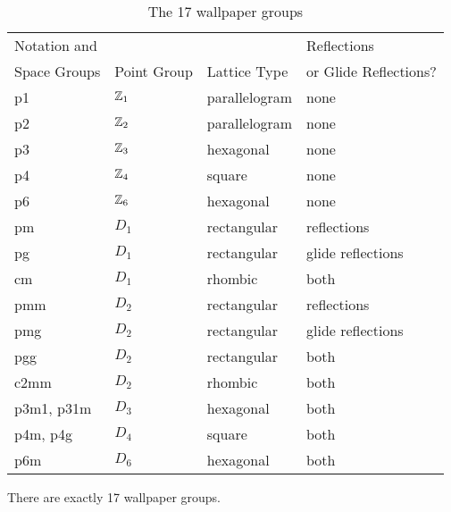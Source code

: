 \begin{table}[htb]
\caption{The 17 wallpaper groups}{\small
\begin{center}
\begin{tabular}{|l|l|l|l|}
\hline
Notation and &             &              & Reflections  \\
Space Groups & Point Group & Lattice Type & or Glide Reflections? \\
\hline
p1 & ${\Bbb Z}_1$ & parallelogram & none \\
p2 & ${\Bbb Z}_2$ & parallelogram & none \\
p3 & ${\Bbb Z}_3$ & hexagonal & none \\
p4 & ${\Bbb Z}_4$ & square & none \\
p6 & ${\Bbb Z}_6$ & hexagonal & none \\
pm & $D_1$ & rectangular & reflections \\
pg & $D_1$ & rectangular & glide reflections\\
cm & $D_1$ & rhombic & both \\
pmm & $D_2$ & rectangular & reflections \\
pmg & $D_2$ & rectangular & glide reflections \\
pgg & $D_2$ & rectangular & both \\
c2mm & $D_2$ & rhombic & both \\
p3m1, p31m & $D_3$ & hexagonal & both \\
p4m, p4g & $D_4$ & square & both \\
p6m & $D_6$ & hexagonal & both \\
\hline
\end{tabular} \label{table:wallpaper}
\end{center}
}
\end{table}
 
 
\begin{theorem}
There are exactly 17 wallpaper groups.
\end{theorem}
 
